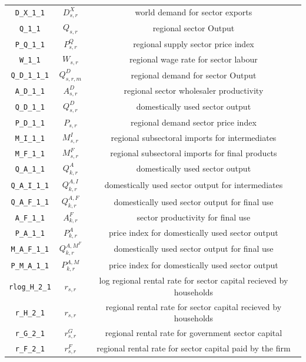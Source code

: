 \begin{center}
\begin{longtable}{ccc}
\texttt{D\_X\_1\_1} & ${D^{X}_{s,r}}$ & world demand for sector exports\\
\texttt{Q\_1\_1} & ${Q_{s,r}}$ & regional sector Output\\
\texttt{P\_Q\_1\_1} & ${P^Q_{s,r}}$ & regional supply sector price index\\
\texttt{W\_1\_1} & ${W_{s,r}}$ & regional wage rate for sector labour\\
\texttt{Q\_D\_1\_1\_1} & ${Q^D_{s,r,m}}$ & regional demand for sector Output\\
\texttt{A\_D\_1\_1} & ${A^{D}_{s,r}}$ & regional sector wholesaler productivity\\
\texttt{Q\_D\_1\_1} & ${Q^{D}_{s,r}}$ & domestically used sector output\\
\texttt{P\_D\_1\_1} & ${P_{s,r}}$ & regional demand sector price index\\
\texttt{M\_I\_1\_1} & ${M^I_{s,r}}$ & regional subsectoral imports for intermediates\\
\texttt{M\_F\_1\_1} & ${M^F_{s,r}}$ & regional subsectoral imports for final products\\
\texttt{Q\_A\_1\_1} & ${Q^{A}_{k,r}}$ & domestically used sector output\\
\texttt{Q\_A\_I\_1\_1} & ${Q^{A,I}_{k,r}}$ & domestically used sector output for intermediates\\
\texttt{Q\_A\_F\_1\_1} & ${Q^{A,F}_{k,r}}$ & domestically used sector output for final use\\
\texttt{A\_F\_1\_1} & ${A^{F}_{k,r}}$ & sector productivity for final use\\
\texttt{P\_A\_1\_1} & ${P^{A}_{k,r}}$ & price index for domestically used sector output\\
\texttt{M\_A\_F\_1\_1} & ${Q^{A,M^F}_{k,r}}$ & domestically used sector output for final use\\
\texttt{P\_M\_A\_1\_1} & ${P^{A,M}_{k,r}}$ & price index for domestically used sector output\\
\texttt{rlog\_H\_2\_1} & ${r_{s,r}}$ & log regional rental rate for sector capital recieved by households\\
\texttt{r\_H\_2\_1} & ${r_{s,r}}$ & regional rental rate for sector capital recieved by households\\
\texttt{r\_G\_2\_1} & ${r^G_{s,r}}$ & regional rental rate for government sector capital\\
\texttt{r\_F\_2\_1} & ${r^F_{s,r}}$ & regional rental rate for sector capital paid by the firm\\

\end{longtable}
\end{center}
